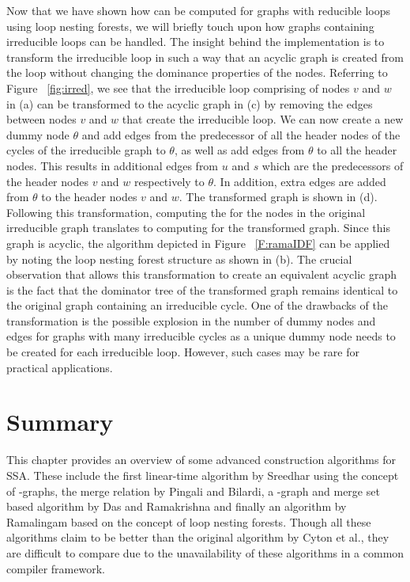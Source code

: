 {    Now that we have shown how \iDF can be computed for graphs with reducible loops using 
    loop nesting forests, we will briefly touch
    upon how graphs containing irreducible loops can be handled. The insight behind the implementation
    is to transform the irreducible loop in such a way that an acyclic graph is created from the loop
    without changing the dominance properties of the nodes. Referring to Figure ~\ref{fig:irred}, we see 
    that the irreducible loop comprising of nodes $v$ and $w$ in (a) can be transformed to the acyclic
    graph in (c) by removing the edges between nodes $v$ and $w$ that create the irreducible loop. 
    We can now create a new dummy node $\theta$ and add edges from the predecessor of all
    the header nodes of the cycles of the irreducible graph to $\theta$, 
    as well as add edges from $\theta$ to all the 
    header nodes. This results in additional edges from $u$ and $s$ which are the predecessors of the
    header nodes $v$ and $w$ respectively to $\theta$. In addition, extra edges are added from $\theta$
    to the header nodes $v$ and $w$. The transformed graph is shown in (d). Following this transformation, 
    computing the \iDF for the nodes 
    in the original irreducible graph translates to computing \iDF for the transformed graph. Since this
    graph is acyclic, the algorithm depicted in Figure ~\ref{F:ramaIDF} can be applied by noting the
    loop nesting forest structure as shown in (b). The crucial observation that allows this transformation 
    to create an equivalent acyclic
    graph is the fact that the dominator tree of the transformed graph remains identical to the
    original graph containing an irreducible cycle. One of the drawbacks of the transformation is the
    possible explosion in the number of dummy nodes and edges for graphs with many irreducible cycles as
    a unique dummy node needs to be created for each irreducible loop. However, such cases may be rare
    for practical applications.

    \section{Summary}
    This chapter provides an overview of some advanced construction algorithms for SSA. These include the first  linear-time algorithm by Sreedhar using the concept of \DJ-graphs, the merge relation by Pingali and Bilardi, a \DJ-graph and merge set based algorithm by Das and Ramakrishna and finally an algorithm by Ramalingam based on the concept of loop nesting forests. Though all these algorithms claim to be better than the original algorithm by Cyton et al., they are difficult to compare due to the unavailability of these algorithms in a common compiler framework. 

}
